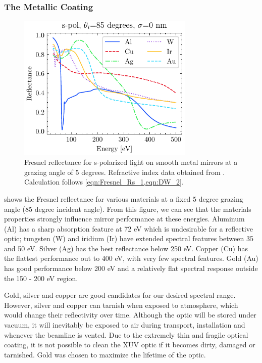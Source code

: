 \subsubsection{The Metallic Coating}

\begin{figure}
	\centering
	\includegraphics[width=0.75\textwidth]{figures/chap2/Fresnel_NoSigma.pdf}
	\caption{Fresnel reflectance for s-polarized light on smooth metal mirrors at a grazing angle of 5 degrees. Refractive index data obtained from \cite{gulliksonCXROXRayInteractions,henkeXRayInteractionsPhotoabsorption1993}. Calculation follows \cref{eqn:Fresnel_Rs_1,eqn:DW_2}.}
	\label{fig:Mirror_Material_Choice}
\end{figure}


 shows the Fresnel reflectance for various materials at a fixed 5 degree grazing angle (85 degree incident angle). From this figure, we can see that the materials properties strongly influence mirror performance at these energies. Aluminum (Al) has a sharp absorption feature at 72 eV which is undesirable for a reflective optic; tungsten (W) and iridium (Ir) have extended spectral features between 35 and 50 eV. Silver (Ag) has the best reflectance below 250 eV. Copper (Cu) has the flattest performance out to 400 eV, with very few spectral features. Gold (Au) has good performance below 200 eV and a relatively flat spectral response outside the 150 - 200 eV region. 

Gold, silver and copper are good candidates for our desired spectral range. However, silver and copper can tarnish when exposed to atmosphere, which would change their reflectivity over time. Although the optic will be stored under vacuum, it will inevitably be exposed to air during transport, installation and whenever the beamline is vented. Due to the extremely thin and fragile optical coating, it is not possible to clean the XUV optic if it becomes dirty, damaged or tarnished. Gold was chosen to maximize the lifetime of the optic.

